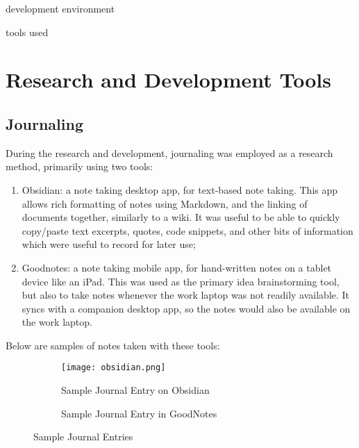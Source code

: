 \todo development environment

\todo tools used


\section{Research and Development Tools}


\subsection{Journaling}

During the research and development, journaling was employed as a research method, primarily using two tools:

\begin{enumerate}
    \item Obsidian\footnotemark[1]: a note taking desktop app, for text-based note taking. This app allows rich formatting of notes using Markdown, and the linking of documents together, similarly to a wiki. It was useful to be able to quickly copy/paste text excerpts, quotes, code snippets, and other bits of information which were useful to record for later use;
    \item Goodnotes\footnotemark[2]: a note taking mobile app, for hand-written notes on a tablet device like an iPad. This was used as the primary idea brainstorming tool, but also to take notes whenever the work laptop was not readily available. It syncs with a companion desktop app, so the notes would also be available on the work laptop.
\end{enumerate}

Below are samples of notes taken with these tools:


\begin{figure}[H]
  \centering
  \begin{subfigure}[b]{0.45\textwidth}
    \centering
    \texttt{[image: obsidian.png]}
    \caption[Sample Journal Entry in Obsidian]{Sample Journal Entry on Obsidian}
    \label{fig:obsidian}
  \end{subfigure}
  \hfill
  \begin{subfigure}[b]{0.45\textwidth}
    \centering
    \begingroup
    \setlength{\fboxsep}{0pt} %
    \setlength{\fboxrule}{0.5pt} %
    \endgroup
    \caption[Sample Journal Entry in GoodNotes]{Sample Journal Entry in GoodNotes}
    \label{fig:goodnotes}
  \end{subfigure}
  \caption{Sample Journal Entries}
  \label{fig:sample-journal}
\end{figure}




